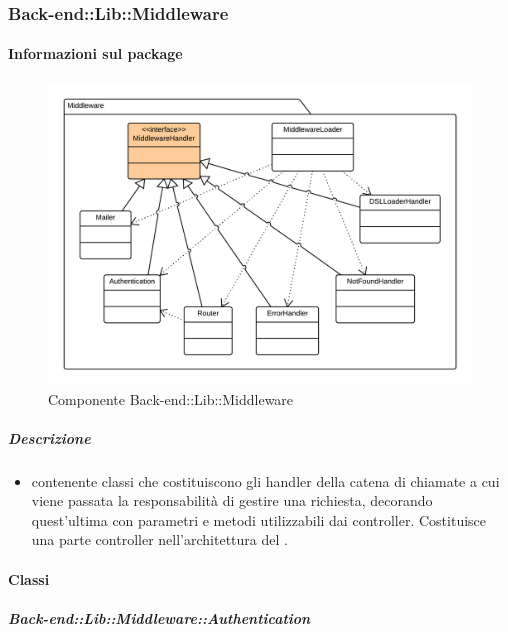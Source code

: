   \subsubsection{Back-end::Lib::Middleware}
  \paragraph{Informazioni sul package} 
    \begin{figure}[H] 
      \begin{center} 
        \includegraphics[width=\textwidth]{packages/Back-end::Lib::Middleware.png}  
        \caption{Componente Back-end::Lib::Middleware}
      \end{center}  
    \end{figure} 
  \subparagraph{Descrizione} 
    \begin{itemize}
    \item[]  contenente classi che costituiscono gli handler della catena di chiamate a cui viene passata la responsabilità di gestire una richiesta,  decorando quest'ultima con parametri e metodi utilizzabili dai controller. Costituisce una parte controller nell'architettura  del .
    \end{itemize} 
    \paragraph{Classi}
      \subparagraph{Back-end::Lib::Middleware::Authentication}
        
